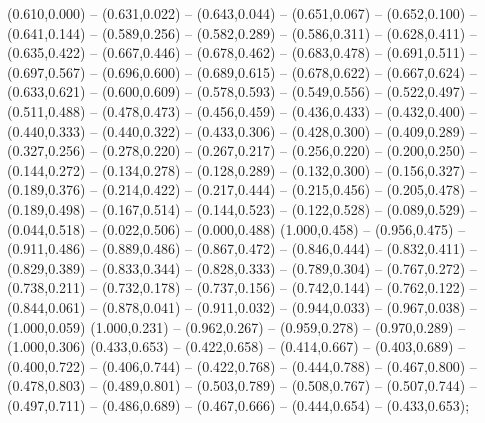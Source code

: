 {		(0.610,0.000) -- (0.631,0.022) -- (0.643,0.044) -- (0.651,0.067) -- (0.652,0.100) -- (0.641,0.144) -- (0.589,0.256) -- (0.582,0.289) -- (0.586,0.311) -- (0.628,0.411) -- (0.635,0.422) -- (0.667,0.446) -- (0.678,0.462) -- (0.683,0.478) -- (0.691,0.511) -- (0.697,0.567) -- (0.696,0.600) -- (0.689,0.615) -- (0.678,0.622) -- (0.667,0.624) -- (0.633,0.621) -- (0.600,0.609) -- (0.578,0.593) -- (0.549,0.556) -- (0.522,0.497) -- (0.511,0.488) -- (0.478,0.473) -- (0.456,0.459) -- (0.436,0.433) -- (0.432,0.400) -- (0.440,0.333) -- (0.440,0.322) -- (0.433,0.306) -- (0.428,0.300) -- (0.409,0.289) -- (0.327,0.256) -- (0.278,0.220) -- (0.267,0.217) -- (0.256,0.220) -- (0.200,0.250) -- (0.144,0.272) -- (0.134,0.278) -- (0.128,0.289) -- (0.132,0.300) -- (0.156,0.327) -- (0.189,0.376) -- (0.214,0.422) -- (0.217,0.444) -- (0.215,0.456) -- (0.205,0.478) -- (0.189,0.498) -- (0.167,0.514) -- (0.144,0.523) -- (0.122,0.528) -- (0.089,0.529) -- (0.044,0.518) -- (0.022,0.506) -- (0.000,0.488)
		(1.000,0.458) -- (0.956,0.475) -- (0.911,0.486) -- (0.889,0.486) -- (0.867,0.472) -- (0.846,0.444) -- (0.832,0.411) -- (0.829,0.389) -- (0.833,0.344) -- (0.828,0.333) -- (0.789,0.304) -- (0.767,0.272) -- (0.738,0.211) -- (0.732,0.178) -- (0.737,0.156) -- (0.742,0.144) -- (0.762,0.122) -- (0.844,0.061) -- (0.878,0.041) -- (0.911,0.032) -- (0.944,0.033) -- (0.967,0.038) -- (1.000,0.059)
		(1.000,0.231) -- (0.962,0.267) -- (0.959,0.278) -- (0.970,0.289) -- (1.000,0.306)
		(0.433,0.653) -- (0.422,0.658) -- (0.414,0.667) -- (0.403,0.689) -- (0.400,0.722) -- (0.406,0.744) -- (0.422,0.768) -- (0.444,0.788) -- (0.467,0.800) -- (0.478,0.803) -- (0.489,0.801) -- (0.503,0.789) -- (0.508,0.767) -- (0.507,0.744) -- (0.497,0.711) -- (0.486,0.689) -- (0.467,0.666) -- (0.444,0.654) -- (0.433,0.653);}
